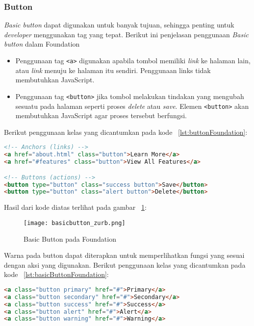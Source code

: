 \subsubsection{Button}
\textit{Basic button} dapat digunakan untuk banyak tujuan, sehingga penting untuk \textit{developer} menggunakan tag yang tepat. Berikut ini penjelasan penggunaan \textit{Basic button} dalam Foundation
\begin{itemize}
	\item Penggunaan tag \texttt{<a>} digunakan apabila tombol memiliki \textit{link} ke halaman lain, atau \textit{link} menuju ke halaman itu sendiri. Penggunaan links tidak membutuhkan JavaScript.
	\item Penggunaan tag \texttt{<button>} jika tombol melakukan tindakan yang mengubah sesuatu pada halaman seperti proses \textit{delete} atau \textit{save}. Elemen \texttt{<button>} akan membutuhkan JavaScript agar proses tersebut berfungsi. 
\end{itemize}
Berikut penggunaan kelas yang dicantumkan pada kode ~\ref{lst:buttonFoundation}:
\begin{lstlisting}[style=customhtml, language=HTML,  basicstyle=\ttfamily, frame=single, columns=fullflexible, keepspaces=true, breaklines=true, showstringspaces=false, label={lst:buttonFoundation}, caption=Button pada foundation 6.] 
<!-- Anchors (links) -->
<a href="about.html" class="button">Learn More</a>
<a href="#features" class="button">View All Features</a>

<!-- Buttons (actions) -->
<button type="button" class="success button">Save</button>
<button type="button" class="alert button">Delete</button>
\end{lstlisting}
Hasil dari kode diatas terlihat pada gambar ~\ref{fig:buttonFoundation}:
\begin{figure} [H]
	\centering  
	\texttt{[image: basicbutton\_zurb.png]}  
	\caption{Basic Button pada Foundation}
	\label{fig:buttonFoundation}
\end{figure}

\noindent Warna pada button dapat diterapkan untuk memperlihatkan fungsi yang sesuai dengan aksi yang digunakan. Berikut penggunaan kelas yang dicantumkan pada kode ~\ref{lst:basicButtonFoundation}:
\begin{lstlisting}[style=customhtml, language=HTML,  basicstyle=\ttfamily, frame=single, columns=fullflexible, keepspaces=true, breaklines=true, showstringspaces=false, label={lst:basicButtonFoundation}, caption=Basic Button pada foundation 6.] 
<a class="button primary" href="#">Primary</a>
<a class="button secondary" href="#">Secondary</a>
<a class="button success" href="#">Success</a>
<a class="button alert" href="#">Alert</a>
<a class="button warning" href="#">Warning</a>
\end{lstlisting}

